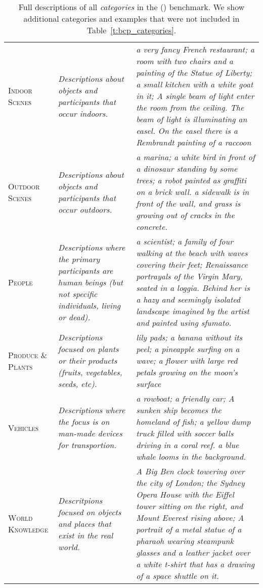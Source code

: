\begin{table*}
\begin{adjustbox}{center}
\begin{tabular}{p{1.5cm}p{5cm}p{10cm}}
\textsc{Indoor Scenes} & \textit{Descriptions about objects and participants that occur indoors.} & \textit{a very fancy French restaurant; a room with two chairs and a painting of the Statue of Liberty; a small kitchen with a white goat in it; A single beam of light enter the room from the ceiling. The beam of light is illuminating an easel. On the easel there is a Rembrandt painting of a raccoon} \\
\textsc{Outdoor Scenes} & \textit{Descriptions about objects and participants that occur outdoors.} & \textit{a marina; a white bird in front of a dinosaur standing by some trees; a robot painted as graffiti on a brick wall. a sidewalk is in front of the wall, and grass is growing out of cracks in the concrete.} \\
\textsc{People} & \textit{Descriptions where the primary participants are human beings (but not specific individuals, living or dead).} & \textit{a scientist; a family of four walking at the beach with waves covering their feet; Renaissance portrayals of the Virgin Mary, seated in a loggia. Behind her is a hazy and seemingly isolated landscape imagined by the artist and painted using sfumato.} \\
\textsc{Produce \& Plants} & \textit{Descriptions focused on plants or their products (fruits, vegetables, seeds, etc).} & \textit{lily pads; a banana without its peel; a pineapple surfing on a wave; a flower with large red petals growing on the moon's surface} \\
\textsc{Vehicles} & \textit{Descriptions where the focus is on man-made devices for transportion.} & \textit{a rowboat; a friendly car; A sunken ship becomes the homeland of fish; a yellow dump truck filled with soccer balls driving in a coral reef. a blue whale looms in the background.} \\
\textsc{World Knowledge} & \textit{Descritpions focused on objects and places that exist in the real world.} & \textit{A Big Ben clock towering over the city of London; the Sydney Opera House with the Eiffel tower sitting on the right, and Mount Everest rising above; A portrait of a metal statue of a pharaoh wearing steampunk glasses and a leather jacket over a white t-shirt that has a drawing of a space shuttle on it.} \\
\bottomrule
\end{tabular}
\end{adjustbox}
\caption{Full descriptions of all {\it categories} in the \bcp{} (\bcpa{}) benchmark. We show additional categories and examples that were not included in Table~\ref{t:bcp_categories}.}
\label{t:appendix_bcp_categories}
\end{table*}
